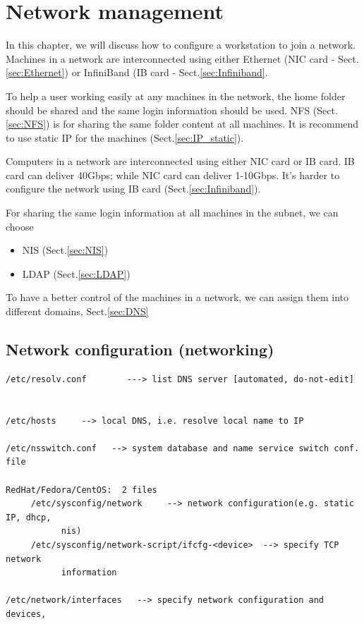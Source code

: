 \chapter{Network management}
\label{chap:network_install}

In this chapter, we will discuss how to configure a workstation to join a
network. Machines in a network are interconnected using either Ethernet (NIC
card - Sect.\ref{sec:Ethernet}) or InfiniBand (IB card -
Sect.\ref{sec:Infiniband}.

To help a user working easily at any machines in the network, the home folder
should be shared and the same login information should be used. NFS
(Sect.\ref{sec:NFS}) is for sharing the same folder content at all machines. It
is recommend to use static IP for the machines (Sect.\ref{sec:IP_static}).

Computers in a network are interconnected using either NIC card or IB card.
IB card can deliver 40Gbps; while NIC card can deliver 1-10Gbps. It's harder to
configure the network using IB card (Sect.\ref{sec:Infiniband}).

For sharing the same login information at all machines in the subnet, we can
choose
\begin{itemize}
  \item NIS (Sect.\ref{sec:NIS}) 
  \item LDAP (Sect.\ref{sec:LDAP})
\end{itemize} 

To have a better control of the machines in a network, we can assign them into
different domains, Sect.\ref{sec:DNS}

\section{Network configuration (networking)}


\begin{verbatim}
/etc/resolv.conf        ---> list DNS server [automated, do-not-edit]


/etc/hosts     --> local DNS, i.e. resolve local name to IP

/etc/nsswitch.conf   --> system database and name service switch conf. file

RedHat/Fedora/CentOS:  2 files
     /etc/sysconfig/network     --> network configuration(e.g. static IP, dhcp,
           nis)
     /etc/sysconfig/network-script/ifcfg-<device>  --> specify TCP network
           information

/etc/network/interfaces   --> specify network configuration and devices, 
\end{verbatim}

